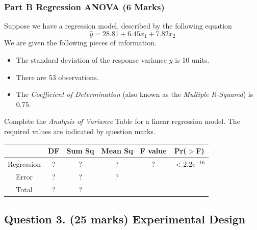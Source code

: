 \documentclass[a4paper,12pt]{article}
\begin{document}
\subsubsection*{Part B Regression ANOVA (6 Marks)}
Suppose we have a regression model, described by the following equation
\[ \hat{y} = 28.81 + 6.45x_1 + 7.82 x_2\]
We are given the following pieces of information.
\begin{itemize}
	\item The standard deviation of the response variance $y$ is 10 units.
	\item There are 53 observations.
	\item The \textit{Coefficient of Determination} (also known as the \textit{Multiple R-Squared}) is 0.75.
\end{itemize}
Complete the \textit{Analysis of Variance} Table for a linear regression model.
The required values are indicated by question marks.

\begin{center}
	\begin{tabular}{|c|c|c|c|c|c|} \hline
		\phantom{makespace}	& DF & 	Sum Sq &	Mean Sq &	F value &   	Pr($>$F)    \\ \hline
		Regression &  \phantom{make}?\phantom{make} &	? &	? &	 ? &	$< 2.2e^{-16}$ \\ \hline
		Error  & ? &	? &  	?   &            &       \\ \hline
		Total  & ?  &	? &  \phantom{makespace}	  &   \phantom{makespace}         &    \phantom{makespace}    \\ \hline
	\end{tabular} 
\end{center}



\subsection*{Question 3. (25 marks) Experimental Design }
\end{document}
